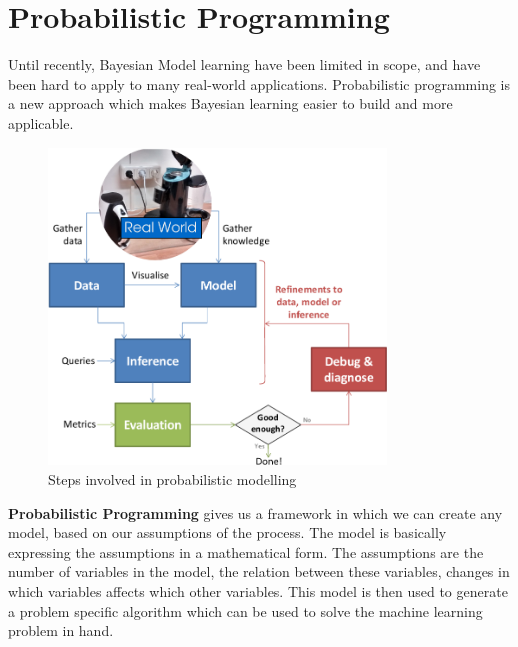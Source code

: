

\section{Probabilistic Programming}

Until recently, Bayesian Model learning have been limited in scope, and have been hard to apply to many real-world applications. Probabilistic programming is a new approach which makes Bayesian learning easier to build and more applicable. 


\begin{figure}[htp]
\centering
\includegraphics[width=0.8\textwidth]{pictures/Lifecycle.png}
\caption[Steps involved in probabilistic modelling ]{Steps involved in probabilistic modelling  \protect\footnotemark }
\label{}
\end{figure}

\textbf{Probabilistic Programming} gives us a framework in which we can create any model, based on our assumptions of the process. The model is basically expressing the assumptions in a mathematical form. The assumptions are the number of variables in the model, the relation between these variables, changes in which variables affects which other variables. This model is then used to generate a problem specific algorithm which can be used to solve the machine learning problem in hand. 

